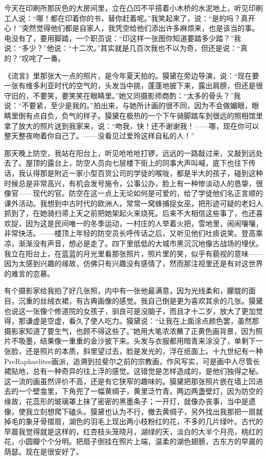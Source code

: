 \par 今天在印刷所那灰色的大房间里，立在凸凹不平搭着小木桥的水泥地上，听见印刷工人说：“哪！都在印着你的书，替你赶着呢。”我笑起来了，说：“是的吗？真开心！”突然觉得他们都是自家人，我凭空给他们添出许多麻烦来，也是该当的事。电没有了，要用脚踏，一个职员说：“印这样一张图你知道要踏多少踏？”我说：“多少？”他说：“十二次。”其实就是几百次我也不以为奇，但还是说：“真的？”叹咤了一番。
\par 《流言》里那张大一点的照片，是今年夏天拍的。獏黛在旁边导演，说：“现在要一张有维多利亚时代的空气的，头发当中挑，蓬蓬地披下来，露出肩膀，但还是很守旧的，不要笑，要笑笑在眼睛里。”她又同摄影师商酌：“太多的骨头？”我说：“不要紧，至少是我的。”拍出来，与她所计画的很不同，因为不会做媚眼，眼睛里倒有点自负，负气的样子。獏黛在极热的一个下午骑脚踏车到很远的照相馆里拿了放大的照片送到我家来，说：“吻我，快！还不谢谢我！——哪，现在你可以整天整夜吻着你自己了。——没看见过爱玲这样自私的人！”
\par 那天晚上防空，我站在阳台上，听见呛呛呛打锣，远远的一路敲过来，又敲到远处去了。屋顶的露台上，防空人员向七层楼下街上的同事大声叫喊，底下也往下传话，我认得那是附近一家小型百货公司的学徒的喉咙，都是半大的孩子，碰到这种时候总是非常高兴，有机会发号施令，公事公办，脸上有一种惨淡动人的恳挚，很像官——现代的官。防空在这一点上无论如何是可爱的，给了学徒他们名正言顺的课外活动。我想到中古时代的欧洲人，常常一窝蜂捕捉女巫，把形迹可疑的老妇人抓到了，在她骑扫帚上天之前把她架起火来烧死。后来不大相信这些事了，也还喜欢捉，因为这是民间唯一的冬季运动，一村庄的人举着火把，雪地里，闹闹嚷嚷，非常快活。——楼顶上年轻的防空员长呼传话之后，又听见他们吐痰说笑。登高乘凉，渐渐没有声音，想必是走了。四下里低低的大城市黑沉沉地像古战场的埋伏。我立在阳台上，在蓝蓝的月光里看那张照片，照片里的笑，似乎有藐视的意味——因为太感到兴趣的缘故，仿佛只有兴趣没有感情了，然而那注视里还是有对这世界的难言的恋慕。
\par 有个摄影家给我拍了好几张照，内中有一张他最满意，因为光线柔和，朦胧的面目，沉重的丝绒衣裙，有古典画像的感觉。我自己倒是更为喜欢其余的几张。獏黛也说这一张像个修道院的女孩子，驯良可是没脑子，而且才十二岁，放大了更加觉得，那谦虚是空虚，看久了使人吃力。獏黛说：“让我在上面涂点颜色罢，虽然那摄影家知道了要生气，也顾不得这些了。”她用大笔浓浓蘸了正黄色画背景，因为照片不吸墨，结果像一重重的金沙披下来。头发与衣服都用暗青来涂没了，单剩下一张脸，还是照片的本质，斜里望过去，脸是发光的，浮在纸面上。十九世纪有一种PreRaphaelites画派，追溯到拉斐尔之前的宗教画，作风写实，可是画中人尽管长裙贴地，总有一种奇异的往上浮的感觉。这错觉是怎样造成的，是他们独得之秘。这一流的画虽然评价不高，还是有它狭窄的趣味的。獏黛把那张照片嵌在墙上凹进去的一个壁龛里，下角兜了一幅黄绸子，黄里泛竹青。两边两盏壁灯，因为防空的缘故，花蕊形的玻璃罩上抹了密密的黑墨条子；一开灯，就像办丧事，当中是遗像，使我立刻想爬下磕头。獏黛也认为不行，撤去黄绸子，另外找出我那把一扇就掉毛的象牙骨摺扇，湖色的羽毛上现出两小枝粉红的花，不多的几片绿叶。古代的早晨我觉得就是这样的，红杏枝头笼晓月，湖绿的天，淡白的大半个月亮，桃红的花，小圆瓣个个分明。把扇子倒挂在照片上端，温柔的湖色翅膀，古东方的早晨的荫瑟。现在是很安好了。
